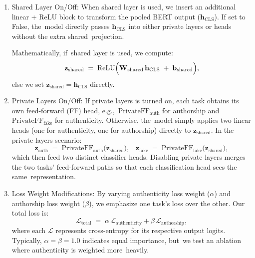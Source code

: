 \documentclass[electronics,article,accept,pdftex,moreauthors,electronics]{Definitions/mdpi}
\begin{document}
\begin{enumerate}
  \item Shared Layer On/Off: 
  When shared layer is used, we insert an additional linear + ReLU block 
  to transform the pooled BERT output (\(\mathbf{h}_{\text{CLS}}\)). 
  If set to False, the~model directly passes \(\mathbf{h}_{\text{CLS}}\) into either private layers 
  or heads without the extra shared~projection. 
  
  Mathematically, if~shared layer is used, we compute:
\begin{equation}
  \label{eq:ablation_shared}
  \mathbf{z}_\mathrm{shared} \;=\; \mathrm{ReLU}\Bigl(\mathbf{W}_\mathrm{shared}\,\mathbf{h}_{\text{CLS}} \;+\; \mathbf{b}_\mathrm{shared}\Bigr),
  \end{equation}
  else we set \(\mathbf{z}_\mathrm{shared} = \mathbf{h}_{\text{CLS}}\) directly.

  \item Private Layers On/Off:
  If private layers is turned on, each task obtains its own feed-forward (FF) head, 
  e.g.,~\(\mathrm{PrivateFF}_{\mathrm{auth}}\) for authorship and \(\mathrm{PrivateFF}_{\mathrm{fake}}\) 
  for authenticity. Otherwise, the~model 
  simply applies two linear heads (one for authenticity, one for authorship) directly to \(\mathbf{z}_\mathrm{shared}\). 
  In the private layers scenario:
\begin{equation}
  \mathbf{z}_{\mathrm{auth}} \;=\; \mathrm{PrivateFF}_{\mathrm{auth}}\!\bigl(\mathbf{z}_\mathrm{shared}\bigr),\;\;\;
  \mathbf{z}_{\mathrm{fake}} \;=\; \mathrm{PrivateFF}_{\mathrm{fake}}\!\bigl(\mathbf{z}_\mathrm{shared}\bigr),
  \end{equation}
  which then feed two distinct classifier heads. Disabling private layers merges the two tasks' feed-forward paths 
  so that each classification head sees the same~representation.

  \item Loss Weight Modifications:
  By varying authenticity loss weight (\(\alpha\)) and authorship loss weight (\(\beta\)), we emphasize one task's loss over the other. Our total loss is:
\begin{equation}
  \label{eq:ablation_loss_total}
  \mathcal{L}_{\text{total}} \;=\; \alpha\,\mathcal{L}_{\text{authenticity}} + \beta\,\mathcal{L}_{\text{authorship}},
  \end{equation}
  where each \(\mathcal{L}\) represents cross-entropy for its respective output logits. %
  Typically, 
  \(\alpha = \beta = 1.0\) indicates equal importance, but~we test an ablation where authenticity is weighted more~heavily.

\end{enumerate}
\end{document}
